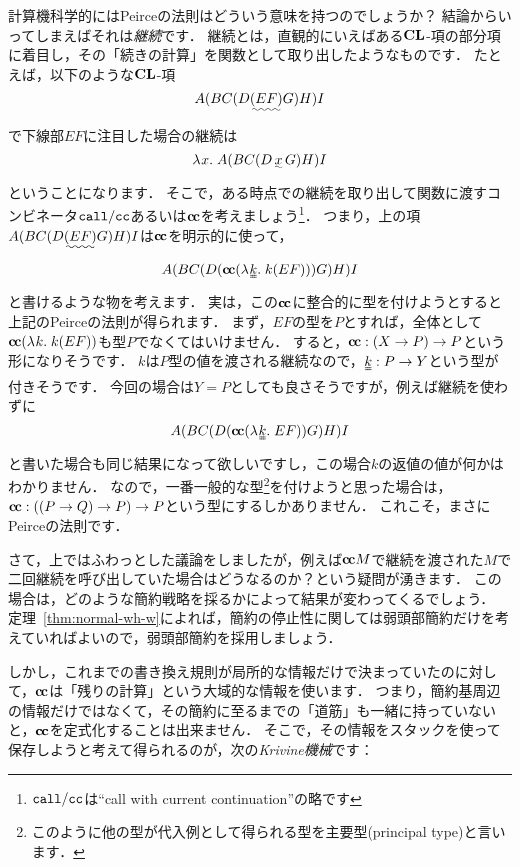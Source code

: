 \documentclass[realisability.tex]{subfiles}
\begin{document}
計算機科学的にはPeirceの法則はどういう意味を持つのでしょうか？
結論からいってしまえばそれは\emph{継続}です．
継続とは，直観的にいえばある$\mathord{\mathbf{CL}}$-項の部分項に着目し，その「続きの計算」を関数として取り出したようなものです．
たとえば，以下のような$\mathord{\mathbf{CL}}$-項
\[
 A(BC(D\uwave{(EF)}G)H)I
\]
で下線部$EF$に注目した場合の継続は
\[
 \abs{x}{A(BC(D\, \uwave{x} \,G)H)I}
\]
ということになります．
そこで，ある時点での継続を取り出して関数に渡すコンビネータ$\mathop{\mathtt{call/cc}}$あるいは$\mathsf{\mathbf{c\hspace{-1pt}c}}$を考えましょう\footnote{$\mathop{\mathtt{call/cc}}$は``call with current continuation''の略です}．
つまり，上の項$A(BC(D\uwave{(EF)}G)H)I$は$\mathsf{\mathbf{c\hspace{-1pt}c}}$を明示的に使って，
\[
 A(BC(D(\cc(\abs{\uuline{k}}{k (EF)}))G)H)I
\]
と書けるような物を考えます．
実は，この$\mathsf{\mathbf{c\hspace{-1pt}c}}$に整合的に型を付けようとすると上記のPeirceの法則が得られます．
まず，$EF$の型を$P$とすれば，全体として$\mathsf{\mathbf{c\hspace{-1pt}c}} (\lambda^{\mathsf{}}k.\;k (EF))$も型$P$でなくてはいけません．
すると，$\mathsf{\mathbf{c\hspace{-1pt}c}}: (X \to P) \to P$という形になりそうです．
$k$は$P$型の値を渡される継続なので，$\uuline{k}: P \to Y$という型が付きそうです．
今回の場合は$Y = P$としても良さそうですが，例えば継続を使わずに
\[
 A(BC(D(\cc(\abs{\uuline{k}}{EF}))G)H)I
\]
と書いた場合も同じ結果になって欲しいですし，この場合$k$の返値の値が何かはわかりません．
なので，一番一般的な型\footnote{このように他の型が代入例として得られる型を主要型(principal type)と言います．}を付けようと思った場合は，$\mathsf{\mathbf{c\hspace{-1pt}c}}: ((P \to Q) \to P) \to P$という型にするしかありません．
これこそ，まさにPeirceの法則です．

さて，上ではふわっとした議論をしましたが，例えば$\mathsf{\mathbf{c\hspace{-1pt}c}} M$で継続を渡された$M$で二回継続を呼び出していた場合はどうなるのか？という疑問が湧きます．
この場合は，どのような簡約戦略を採るかによって結果が変わってくるでしょう．
定理~\ref{thm:normal-wh-w}によれば，簡約の停止性に関しては弱頭部簡約だけを考えていればよいので，弱頭部簡約を採用しましょう．

しかし，これまでの書き換え規則が局所的な情報だけで決まっていたのに対して，$\mathsf{\mathbf{c\hspace{-1pt}c}}$は「残りの計算」という大域的な情報を使います．
つまり，簡約基周辺の情報だけではなくて，その簡約に至るまでの「道筋」も一緒に持っていないと，$\mathsf{\mathbf{c\hspace{-1pt}c}}$を定式化することは出来ません．
そこで，その情報をスタックを使って保存しようと考えて得られるのが，次の\emph{Krivine機械}です：
\end{document}
